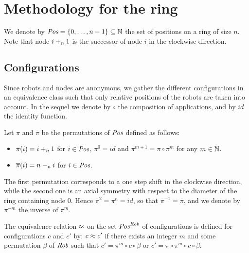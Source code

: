 \section{Methodology for the ring}
We denote by $\textit{Pos}=\{0,\dots, n-1\}  \subseteq \mathbb{N}$ the set of positions on a ring of size $n$. 
Note that node $i+_n 1$ is the successor of node $i$ in the clockwise direction.

\subsection{Configurations} %
\label{subsubsec:conf}
Since robots and nodes are anonymous, we gather the different configurations in 
an equivalence class such that only relative positions of the robots are taken into account.
In the sequel we denote by $\circ$ the composition of applications, and by $id$ the identity function.
 
Let $\pi$ and $\overline{\pi}$ be the permutations of
$\textit{Pos}$ defined as follows:
\begin{itemize}
\item $\pi(i)=i +_n 1$ for $i \in \textit{Pos}$, $\pi^0=id$ and $\pi^{m+1}= \pi \circ \pi^m$ for any $m \in \mathbb{N}$. 
\item $\overline{\pi}(i) = n -_n i$ for $i \in \textit{Pos}$.
\end{itemize}
 The first permutation corresponds to a one step shift in the
clockwise direction, while the second one is an axial symmetry with
respect to the diameter of the ring containing node $0$. 
Hence $\overline{\pi}^2= \pi^n=id$, so that
$\overline{\pi}^{-1} = \overline{\pi}$, and we denote by
$\pi^{-m}$ the inverse of $\pi^{m}$.

\begin{definition}
\label{def:confEq}
The equivalence relation $\approx$ on the set $\textit{Pos}^{\textit{Rob}}$ of
configurations is defined for configurations $c$ and $c'$ by: $c
\approx c'$ if there exists an integer $m$ and some permutation $\beta$
of $\textit{Rob}$ such that $c' = \pi^m \circ c \circ \beta$ or
$c'= \overline{\pi} \circ \pi^m \circ c \circ
\beta$.
\end{definition}

